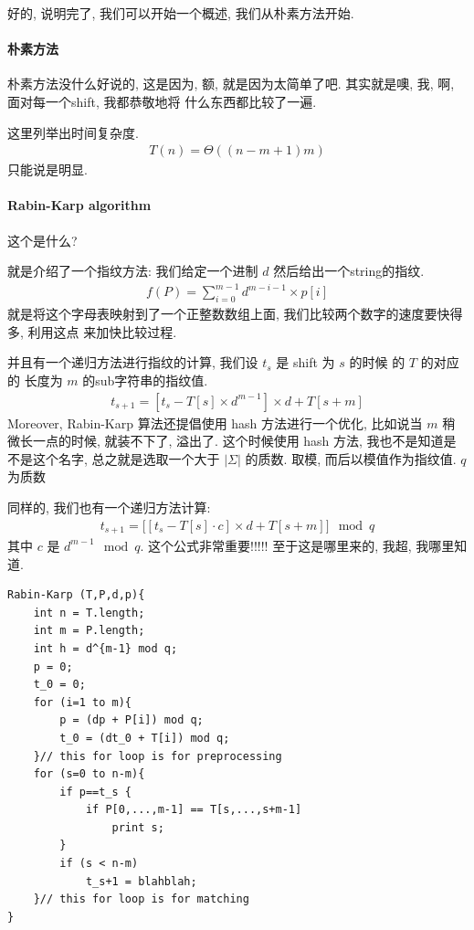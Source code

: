 \documentclass[a4paper, 10pt]{ctexart} %
\begin{document}
好的, 说明完了, 
我们可以开始一个概述, 
我们从朴素方法开始. 

\paragraph{朴素方法} %
\label{par:朴素方法}
朴素方法没什么好说的, 这是因为,
额, 就是因为太简单了吧. 其实就是噢, 我, 
啊, 面对每一个shift, 我都恭敬地将
什么东西都比较了一遍. 

这里列举出时间复杂度. 
\begin{align*}
    T(n) =  \Theta \left( ( n - m + 1 ) m \right)
\end{align*}
只能说是明显.

\paragraph{Rabin-Karp algorithm} %
\label{par:Rabin-Karp algorithm}
这个是什么? 

就是介绍了一个指纹方法: 我们给定一个进制 $d$
然后给出一个string的指纹. 
\begin{align*}
    f\left( P\right) = 
    \sum_{i=0} ^{m-1}d^{m-i-1} \times p[i]
\end{align*}
就是将这个字母表映射到了一个正整数数组上面,
我们比较两个数字的速度要快得多, 利用这点
来加快比较过程. 

并且有一个递归方法进行指纹的计算, 我们设 $t_{s}$ 是 shift 为 $s$ 的时候
的 $T$ 的对应的 长度为 $m$ 的sub字符串的指纹值.
\begin{align*}
t_{s + 1} =\left[ t _{s} - T[s]\times d^{m-1} \right] \times d + T[s+m]
\end{align*}
Moreover, Rabin-Karp 算法还提倡使用 hash 方法进行一个优化, 
比如说当 $m$ 稍微长一点的时候, 就装不下了, 溢出了. 这个时候使用
hash 方法, 我也不是知道是不是这个名字, 
总之就是选取一个大于 $\left| \Sigma \right| $ 的质数. 
取模, 而后以模值作为指纹值. $q $ 为质数

同样的, 我们也有一个递归方法计算:
\begin{align*}
t _{s + 1} = \Big[\left[ t_{s} - T[s] \cdot c \right] \times d + T[s+m]  \Big]\mod q
\end{align*}
其中 $c$ 是 $d ^{m-1} \mod q$.  
这个公式非常重要!!!!! 至于这是哪里来的, 我超, 我哪里知道.

\begin{verbatim}
Rabin-Karp (T,P,d,p){
    int n = T.length;
    int m = P.length;
    int h = d^{m-1} mod q;
    p = 0;
    t_0 = 0;
    for (i=1 to m){ 
        p = (dp + P[i]) mod q;
        t_0 = (dt_0 + T[i]) mod q;
    }// this for loop is for preprocessing
    for (s=0 to n-m){ 
        if p==t_s {
            if P[0,...,m-1] == T[s,...,s+m-1]
                print s;
        }
        if (s < n-m)
            t_s+1 = blahblah;
    }// this for loop is for matching
}
\end{verbatim}
\end{document}
